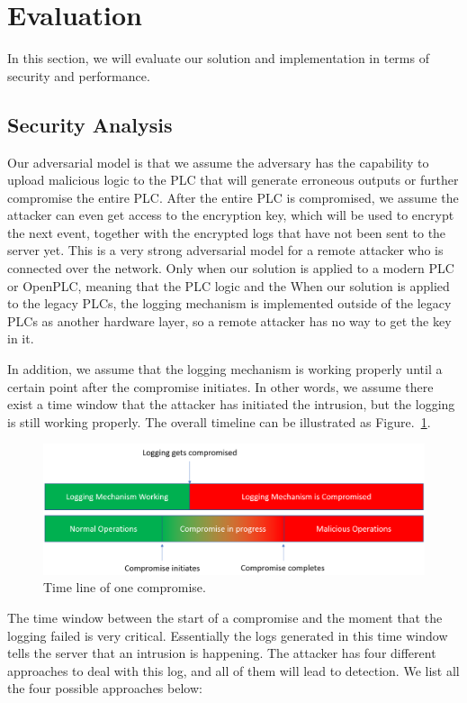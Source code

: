 \section{Evaluation}

In this section, we will evaluate our solution and implementation in terms of security and performance. 

\subsection{Security Analysis}

Our adversarial model is that we assume the adversary has the capability to upload malicious logic to the PLC that will generate erroneous outputs or further compromise the entire PLC. After the entire PLC is compromised, we assume the attacker can even get access to the encryption key, which will be used to encrypt the next event, together with the encrypted logs that have not been sent to the server yet. This is a very strong adversarial model for a remote attacker who is connected over the network. Only when our solution is applied to a modern PLC or OpenPLC, meaning that the PLC logic and the   When our solution is applied to the legacy PLCs, the logging mechanism is implemented outside of the legacy PLCs as another hardware layer, so a remote attacker has no way to get the key in it.  

In addition, we assume that the logging mechanism is working properly until a certain point after the compromise initiates. In other words, we assume there exist a time window that the attacker has initiated the intrusion, but the logging is still working properly. The overall timeline can be illustrated as Figure.~\ref{fig:timeline}. 

\begin{figure}[h]
  \centering
    \includegraphics[width=\textwidth]{figs/timeline}
    \caption{Time line of one compromise.}
    \label{fig:timeline}
\end{figure}

The time window between the start of a compromise and the moment that the logging failed is very critical. Essentially the logs generated in this time window tells the server that an intrusion is happening. The attacker has four different approaches to deal with this log, and all of them will lead to detection. We list all the four possible approaches below:

